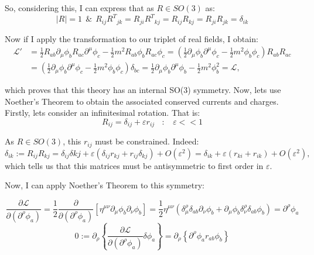 \documentclass[12pt]{article}
\begin{document}
So, considering this, I can express that as \( R \in SO(3) \) as:
\[
    |R| = 1 ~~ \& ~~ R_{ij} {R^T}_{jk} = R_{ji} {R^T}_{kj} = R_{ij} R_{kj} = R_{ji} R_{jk} = \delta_{ik}
\]

Now if I apply the transformation to our triplet of real fields, I obtain:
\begin{align*}
    \mathcal{L}' &= \frac{1}{2} R_{ab} \partial_\mu \phi_b R_{ac} \partial^\mu \phi_c - \frac{1}{2} m^2 R_{ab} \phi_b R_{ac} \phi_c = \left(\frac{1}{2} \partial_\mu \phi_b \partial^\mu \phi_c - \frac{1}{2} m^2 \phi_b \phi_c \right) R_{ab} R_{ac}\\
                 &= \left(\frac{1}{2} \partial_\mu \phi_b \partial^\mu \phi_c - \frac{1}{2} m^2 \phi_b \phi_c \right) \delta_{bc} = \frac{1}{2} \partial_\mu \phi_b \partial^\mu \phi_b - \frac{1}{2} m^2 \phi_b^2 = \mathcal{L},
\end{align*}

which proves that this theory has an internal SO(3) symmetry. Now, lets use Noether's Theorem to obtain the associated conserved currents and charges. Firstly, lets consider an infinitesimal rotation. That is:
\[
    R_{ij} = \delta_{ij} + \varepsilon r_{ij} ~~~~:~~~~ \varepsilon << 1
\]

As \( R \in SO(3) \), this \(r_{ij}\) must be constrained. Indeed:
\[
    \delta_{ik} := R_{ij} R_{kj} = \delta_{ij} \delta{kj} + \varepsilon \left(\delta_{ij} r_{kj} + r_{ij} \delta_{kj} \right) + O(\varepsilon^2) = \delta_{ik} + \varepsilon \left(r_{ki} + r_{ik} \right) + O(\varepsilon^2),
\]
which tells us that this matrices must be antisymmetric to first order in \( \varepsilon \).

\vspace{0.25cm}

Now, I can apply Noether's Theorem to this symmetry:

\[
    \frac{ \partial \mathcal{L} }{ \partial \left( \partial^\rho \phi_a \right)} = \frac{1}{2} \frac{ \partial }{ \partial \left( \partial^\rho \phi_a \right)}\left[ \eta^{\mu\nu} \partial_\mu \phi_b \partial_\nu \phi_b \right] = \frac{1}{2} \eta^{\mu\nu} \left( \delta^\rho_\mu \delta_{ab} \partial_\nu \phi_b + \partial_\mu \phi_b \delta^\rho_\nu \delta_{ab}\phi_b\right) = \partial^\rho \phi_a
\]
\[
    0 := \partial_\rho\left\{\frac{ \partial \mathcal{L} }{ \partial \left( \partial^\rho \phi_a \right)} \delta \phi_a \right\} = \partial_\rho \left\{ \partial^\rho \phi_a r_{ab} \phi_b \right\}
\]
\end{document}
